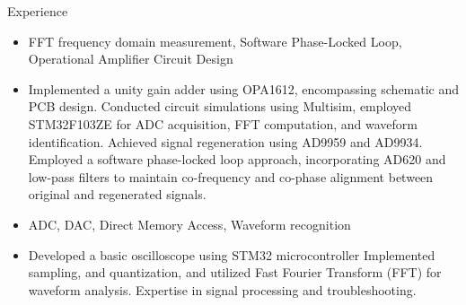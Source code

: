 \documentclass{resume} %
\begin{document}
\begin{workSection}{Experience}

     
    \experienceItem[
        company= TI Cup National Undergraduate Electronics Design Contest,
        location=Jinan{} ,
        position=Signal Separation Device,
        duration=August 2023 
    ]
    \begin{itemize}
        \itemsep -6pt {} 
        \item FFT frequency domain measurement{,} Software Phase-Locked Loop{,} Operational Amplifier Circuit Design
        \item Implemented a unity gain adder using OPA1612, encompassing schematic and PCB design. Conducted circuit simulations using Multisim, employed STM32F103ZE for ADC acquisition, FFT computation, and waveform identification. Achieved signal regeneration using AD9959 and AD9934. Employed a software phase-locked loop approach, incorporating AD620 and low-pass filters to maintain co-frequency and co-phase alignment between original and regenerated signals.

       
     \end{itemize}
     
      \experienceItem[
        company= Lichuang Cup SDUST Electronic Design  Competition,
        location=Qingdao{} ,
        position= Basic oscilloscope and signal Generator,
        duration=April 2023 
    ]
    \begin{itemize}
        \itemsep -6pt {} 
        \item ADC, DAC, Direct Memory Access{,} Waveform recognition 
        \item Developed a basic oscilloscope using STM32 microcontroller Implemented sampling, and quantization, and utilized Fast Fourier Transform (FFT) for waveform analysis. Expertise in signal processing and troubleshooting.
       
     \end{itemize}
     
\end{workSection}
\end{document}
